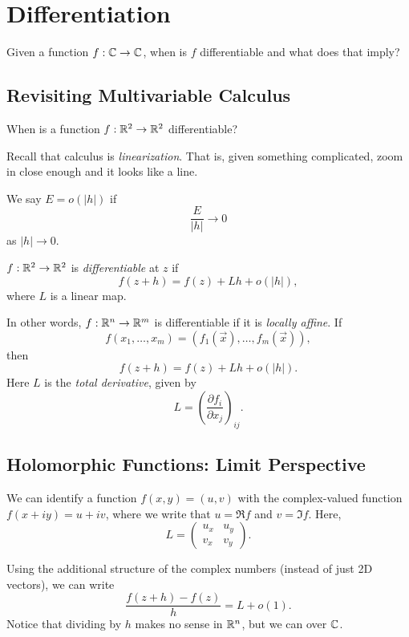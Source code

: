 \chapter{Differentiation}

Given a function $f : \mathbb{C} \to \mathbb{C}$, when is $f$
differentiable and what does that imply?

\section{Revisiting Multivariable Calculus}
When is a function $f : \mathbb{R}^2 \to \mathbb{R}^2$ differentiable?

Recall that calculus is \textit{linearization}. That is,
given something complicated, zoom in close enough and
it looks like a line.

\begin{tcolorbox}[title=Definition (Little-$o$)]
  We say $E = o(|h|)$ if
  \[\frac{E}{|h|} \to 0\]
  as $|h| \to 0$.
\end{tcolorbox}

\begin{tcolorbox}[title=Definition (Differentiability in $\R^2$)]
  $f : \mathbb{R}^2 \to \mathbb{R}^2$ is \textit{differentiable} at
  $z$ if
  \[f(z + h) = f(z) + Lh + o(|h|),\]
  where $L$ is a linear map.
\end{tcolorbox}

In other words, $f : \mathbb{R}^n \to \mathbb{R}^m$ is differentiable if
it is \textit{locally affine}. If
\[
f(x_1, \dots, x_m) = (f_1(\vec{x}), \dots, f_m(\vec{x}))
,\]
then
\[
f(z + h) = f(z) + Lh + o(|h|)
.\] 
Here $L$ is the \textit{total derivative}, given by
\[
  L = \left(\frac{\partial f_i}{\partial x_j}\right)_{ij}
.\]

\section{Holomorphic Functions: Limit Perspective}
We can identify a function $f(x, y) = (u, v)$ with
the complex-valued function $f(x + iy) = u + iv$, where
we write that $u = \Re f$ and $v = \Im f$. Here,
\[
L =
\left(\begin{matrix}
  u_x & u_y \\
  v_x & v_y
\end{matrix}\right)
.\] 

Using the additional structure of the complex numbers
(instead of just 2D vectors), we can write
\[\frac{f(z + h) - f(z)}{h} = L + o(1).\]
Notice that dividing by $h$ makes no sense in $\mathbb{R}^n$, but
we can over $\mathbb{C}$.

